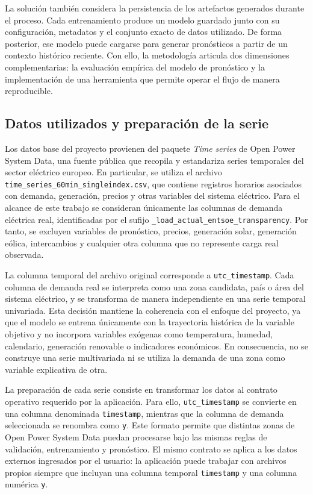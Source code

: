 La solución también considera la persistencia de los artefactos generados durante el proceso. Cada entrenamiento produce un modelo guardado junto con su configuración, metadatos y el conjunto exacto de datos utilizado. De forma posterior, ese modelo puede cargarse para generar pronósticos a partir de un contexto histórico reciente. Con ello, la metodología articula dos dimensiones complementarias: la evaluación empírica del modelo de pronóstico y la implementación de una herramienta que permite operar el flujo de manera reproducible.

\subsection{Datos utilizados y preparación de la serie}

Los datos base del proyecto provienen del paquete \emph{Time series} de Open Power System Data, una fuente pública que recopila y estandariza series temporales del sector eléctrico europeo. En particular, se utiliza el archivo \texttt{time\_series\_60min\_singleindex.csv}, que contiene registros horarios asociados con demanda, generación, precios y otras variables del sistema eléctrico. Para el alcance de este trabajo se consideran únicamente las columnas de demanda eléctrica real, identificadas por el sufijo \texttt{\_load\_actual\_entsoe\_transparency}. Por tanto, se excluyen variables de pronóstico, precios, generación solar, generación eólica, intercambios y cualquier otra columna que no represente carga real observada.

La columna temporal del archivo original corresponde a \texttt{utc\_timestamp}. Cada columna de demanda real se interpreta como una zona candidata, país o área del sistema eléctrico, y se transforma de manera independiente en una serie temporal univariada. Esta decisión mantiene la coherencia con el enfoque del proyecto, ya que el modelo se entrena únicamente con la trayectoria histórica de la variable objetivo y no incorpora variables exógenas como temperatura, humedad, calendario, generación renovable o indicadores económicos. En consecuencia, no se construye una serie multivariada ni se utiliza la demanda de una zona como variable explicativa de otra.

La preparación de cada serie consiste en transformar los datos al contrato operativo requerido por la aplicación. Para ello, \texttt{utc\_timestamp} se convierte en una columna denominada \texttt{timestamp}, mientras que la columna de demanda seleccionada se renombra como \texttt{y}. Este formato permite que distintas zonas de Open Power System Data puedan procesarse bajo las mismas reglas de validación, entrenamiento y pronóstico. El mismo contrato se aplica a los datos externos ingresados por el usuario: la aplicación puede trabajar con archivos propios siempre que incluyan una columna temporal \texttt{timestamp} y una columna numérica \texttt{y}.

